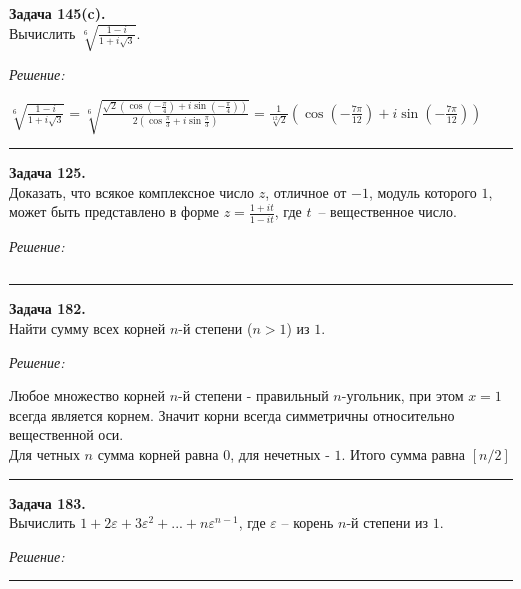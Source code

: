 \documentclass[a4paper, 12pt]{article}
\newenvironment{problem}[2][Задача]
    { \begin{mdframed}[backgroundcolor=gray!10] \textbf{#1 #2.} \\}
    {  \end{mdframed}}
\newenvironment{solution}
    {\textit{Решение: }}
    {\noindent\rule{7in}{1.5pt}}
\begin{document}
\begin{problem}{145(c)}
Вычислить $\sqrt[6]{\displaystyle\frac{1-i}{1+i\sqrt{3}}}$.
\end{problem}
\begin{solution}

$
\sqrt[6]{\displaystyle\frac{1-i}{1+i\sqrt{3}}} =
\sqrt[6]{\frac{\sqrt2(\cos{(-\frac{\pi}{4})} + i\sin{(-\frac{\pi}{4})})}{2(\cos{\frac{\pi}{3}} + i\sin{\frac{\pi}{3}})}} = 
\frac{1}{\sqrt[12]{2}}(\cos{(-\frac{7\pi}{12})} + i\sin{(-\frac{7\pi}{12})})
$

\end{solution} 

\begin{problem}{125}
Доказать, что всякое комплексное число $z$, отличное от $-1$, модуль которого $1$, 
может быть представлено в форме $\displaystyle z=\frac{1+it}{1-it}$, где $t$~-- вещественное число.
\end{problem}
\begin{solution}

$
$

\end{solution} 

\begin{problem}{182}
Найти сумму всех корней $n$-й степени ($n>1$) из $1$.
\end{problem}
\begin{solution}

Любое множество корней $n$-й степени - правильный $n$-угольник, при этом $x = 1$ всегда является корнем.
Значит корни всегда симметричны относительно вещественной оси. \\
Для четных $n$ сумма корней равна $0$, для нечетных - $1$.
Итого сумма равна $\left[n / 2\right]$

\end{solution} 

\begin{problem}{183}
Вычислить $1+2\varepsilon+3\varepsilon^2+...+n\varepsilon^{n-1}$, где $\varepsilon$ -- корень $n$-й степени из $1$.
\end{problem}
\begin{solution}



\end{solution} 
\end{document}
